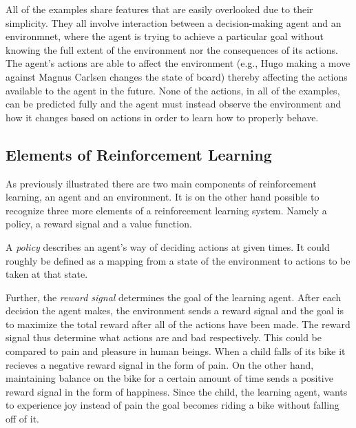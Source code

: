 \documentclass[titlepage]{article}
\begin{document}
\vskip 0.2cm

\noindent
All of the examples share features that are easily overlooked due to their simplicity. They all involve interaction between a decision-making agent and an environmnet, where the agent is trying to achieve a particular goal without knowing the full extent of the environment nor the consequences of its actions. The agent's actions are able to affect the environment (e.g., Hugo making a move against Magnus Carlsen changes the state of board) thereby affecting the actions available to the agent in the future. None of the actions, in all of the examples, can be predicted fully and the agent must instead observe the environment and how it changes based on actions in order to learn how to properly behave. 

\subsection{Elements of Reinforcement Learning}

\vskip 0.3cm

As previously illustrated there are two main components of reinforcement learning, an agent and an environment. It is on the other hand possible to recognize three more elements of a reinforcement learning system. Namely a policy, a reward signal and a value function. 

\vskip 0.3cm

\noindent
A \emph{policy} \cite{sutton} describes an agent's way of deciding actions at given times. It could roughly be defined as a mapping from a state of the environment to actions to be taken at that state. 
\vskip 0.3cm

\noindent
Further, the \emph{reward signal} \cite{sutton} determines the goal of the learning agent. After each decision the agent makes, the environment sends a reward signal and the goal is to maximize the total reward after all of the actions have been made. The reward signal thus determine what actions are and bad respectively. This could be compared to pain and pleasure in human beings. When a child falls of its bike it recieves a negative reward signal in the form of pain. On the other hand, maintaining balance on the bike for a certain amount of time sends a positive reward signal in the form of happiness. Since the child, the learning agent, wants to experience joy instead of pain the goal becomes riding a bike without falling off of it. 

\vskip 0.3cm
\end{document}
